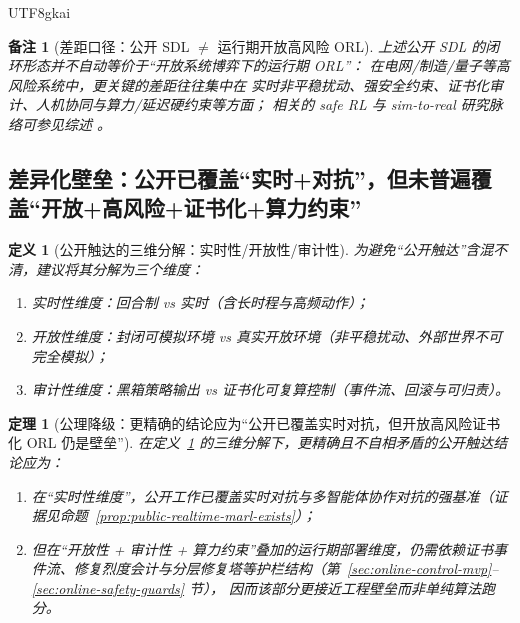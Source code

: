 \documentclass[12pt]{article}
\newtheorem{definition}{定义}[section]
\newtheorem{theorem}{定理}[section]
\newtheorem{remark}{备注}[section]
\begin{document}
\begin{CJK*}{UTF8}{gkai}
\begin{remark}[差距口径：公开 SDL $\neq$ 运行期开放高风险 ORL]
上述公开 SDL 的闭环形态并不自动等价于“开放系统博弈下的运行期 ORL”：
在电网/制造/量子等高风险系统中，更关键的差距往往集中在
实时非平稳扰动、强安全约束、证书化审计、人机协同与算力/延迟硬约束等方面；
相关的 safe RL 与 sim-to-real 研究脉络可参见综述 \cite{ref_jmlr_garcia15a_safe_rl,ref_sciencedirect_s0004370222001515,
  ref_arxiv_2502_13187}。
\end{remark}

\subsection{差异化壁垒：公开已覆盖“实时+对抗”，但未普遍覆盖“开放+高风险+证书化+算力约束”}
\label{sec:calibration-diff-barrier}

\begin{definition}[公开触达的三维分解：实时性/开放性/审计性]
\label{def:public-coverage-3axis}
为避免“公开触达”含混不清，建议将其分解为三个维度：
\begin{enumerate}
  \item 实时性维度：回合制 vs 实时（含长时程与高频动作）；
  \item 开放性维度：封闭可模拟环境 vs 真实开放环境（非平稳扰动、外部世界不可完全模拟）；
  \item 审计性维度：黑箱策略输出 vs 证书化可复算控制（事件流、回滚与可归责）。
\end{enumerate}
\end{definition}

\begin{theorem}[公理降级：更精确的结论应为“公开已覆盖实时对抗，但开放高风险证书化 ORL 仍是壁垒”]
\label{thm:public-coverage-corrected-statement}
在定义~\ref{def:public-coverage-3axis} 的三维分解下，更精确且不自相矛盾的公开触达结论应为：
\begin{enumerate}
  \item 在“实时性维度”，公开工作已覆盖实时对抗与多智能体协作对抗的强基准（证据见命题~\ref{prop:public-realtime-marl-exists}）；
  \item 但在“开放性 + 审计性 + 算力约束”叠加的运行期部署维度，仍需依赖证书事件流、修复烈度会计与分层修复塔等护栏结构（第~\ref{sec:online-control-mvp}--\ref{sec:online-safety-guards} 节），
  因而该部分更接近工程壁垒而非单纯算法跑分。
\end{enumerate}
\end{theorem}


\end{CJK*}
\end{document}
